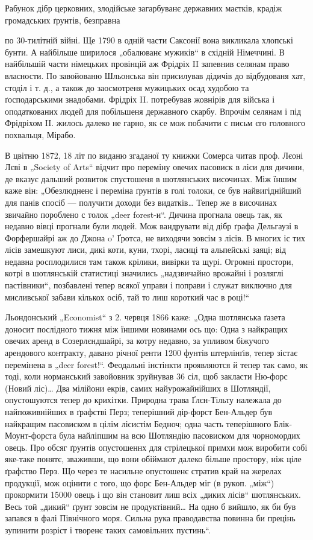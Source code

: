 Рабунок дібр церковних, злодійське загарбуванє державних маєтків, крадіж громадських ґрунтів,
безправна

по 30-тилітній війні. Ще 1790 в одній части Саксонії вона викликала хлопські бунти. А найбільше
ширилося „обалюванє мужиків“ в східній Німеччині. В найбільшій части німецьких провінцій аж Фрідріх
II запевнив селянам право власности. По завойованю Шльонська він присилував дідичів до відбудованя
хат, стоділ і т. д., а також до заосмотреня мужицьких осад худобою та ґосподарськими знадобами.
Фрідріх II. потребував жовнірів для війська і оподаткованих людей для побільшеня державного
скарбу. Впрочім селянам і під Фрідріхом II. жилось далеко не гарно, як се мож побачити с письм єго
головного похвальця, Мірабо.

В цвітню 1872, 18 літ по виданю згаданої ту книжки Сомерса читав проф. Лєоні Лєві в „Society of
Arts“ відчит про переміну овечих пасовиск в ліси для дичини, де вказує дальший розвиток спустошеня в
шотлянських височинах. Між їншим каже він: „Обезлюдненє і переміна ґрунтів в голі толоки, се був
найвигіднійший для панів спосіб — получити доходи без видатків\dots{} Тепер же в височинах звичайно
пороблено с толок
„deer forest-и“. Дичина прогнала овець так, як недавно вівці прогнали були людей. Мож вандрувати від
дібр ґрафа Дельгаузі в Форфершайрі аж до Джона o' Ґротса, не виходячи зовсім з лісів. В многих іс
тих лісів замешкуют лиси, дикі коти, куни, тхорі, ласиці та альпейські заяці; від недавна
росплодилися там також крілики, вивірки та щурі. Огромні простори, котрі в шотлянській статистиці
значились „надзвичайно врожайні
і розляглі пастівники“, позбавлені тепер всякої управи і поправи і служат виключно для мисливської
забави кількох осіб, тай то лиш короткий час в році!“

Льондонський „Economist“ з 2. червця 1866 каже: „Одна шотлянська ґазета доносит послідного тижня між
їншими новинами ось що: Одна з найкращих овечих аренд в Созерлєндшайрі, за котру недавно, за упливом
біжучого арендового контракту, давано річної ренти 1200 фунтів штерлінґів, тепер зістає перемінена в
„deer forest!“. Феодальні інстінкти проявляются й тепер так само, як тоді, коли норманський
завойовник зруйнував 36 сіл, щоб закласти Ню-форс (Новий ліс)\dots{} Два мілійони екрів, самих
найурожайнійших в Шотляндії, опустошуются тепер до крихітки. Природна трава Ґлєн-Тільту належала до
найпоживнійших в ґрафстві Перз; теперішний дір-форст Бен-Альдер був найкращим пасовиском в цілім
лісистім Бедноч; одна часть теперішного Блік-Моунт-форста була найліпшим на всю Шотляндію пасовиском
для чорномордих овець. Про обсяг ґрунтів опустошеннх для стрілецької примхи мож виробити собі
яке-таке понятє, зваживши, що вони обіймают далеко більше простору, ніж ціле ґрафство Перз. Що через
те насильне опустошенє стратив край на жерелах продукції, мож оцінити с того, що форс Бен-Альдер міг
(в рукоп. „між“) прокормити 15000 овець і що він становит лиш  всіх „диких лісів“ шотлянських.
Весь той „дикий“ ґрунт зовсім не продуктівний\dots{} На одно б вийшло, як би був запався в фалі
Північного моря. Сильна рука праводавства повинна би прецінь зупинити розріст і творенє таких
самовільних
пустинь“.
\parbreak{}
